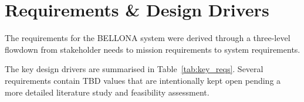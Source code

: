 \chapter{Requirements \& Design Drivers}

The requirements for the BELLONA system were derived through a
three-level flowdown from stakeholder needs to mission requirements
to system requirements.

The key design drivers are summarised in Table~\ref{tab:key_reqs}.
Several requirements contain TBD values that are intentionally
kept open pending a more detailed literature study and feasibility
assessment.


